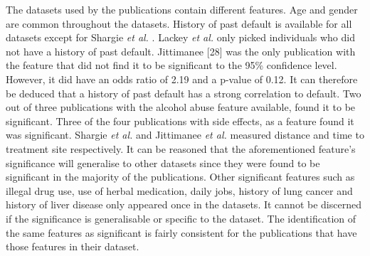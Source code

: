 \documentclass{sig-alternate-05-2015}
\begin{document}
	The datasets used by the publications contain different features. Age and gender are common throughout the datasets. History of past default is available for all datasets except for Shargie \textit{et al.} \cite{Shargie:10.1371/journal.pmed.0040037}. Lackey \textit{et al.} \cite{Lackey:10356751520150601} only picked individuals who did not have a history of past default. Jittimanee \cite{jittimanee:10.1111/j.1440-172X.2007.00650.x} [28] was the only publication with the feature that did not find it to be significant to the 95\% confidence level. However, it did have an odds ratio of 2.19 and a p-value of 0.12. It can therefore be deduced that a history of past default has a strong correlation to default. Two out of three publications with the alcohol abuse feature available, found it to be significant. Three of the four publications with side effects, as a feature found it was significant. Shargie \textit{et al.} \cite{Shargie:10.1371/journal.pmed.0040037} and Jittimanee \textit{et al.} \cite{jittimanee:10.1111/j.1440-172X.2007.00650.x} measured distance and time to treatment site respectively. It can be reasoned that the aforementioned feature's significance will generalise to other datasets since they were found to be significant in the majority of the publications. Other significant features such as illegal drug use, use of herbal medication, daily jobs, history of lung cancer and history of liver disease only appeared once in the datasets. It cannot be discerned if the significance is generalisable or specific to the dataset. The identification of the same features as significant is fairly consistent for the publications that have those features in their dataset. 
	
\end{document}
